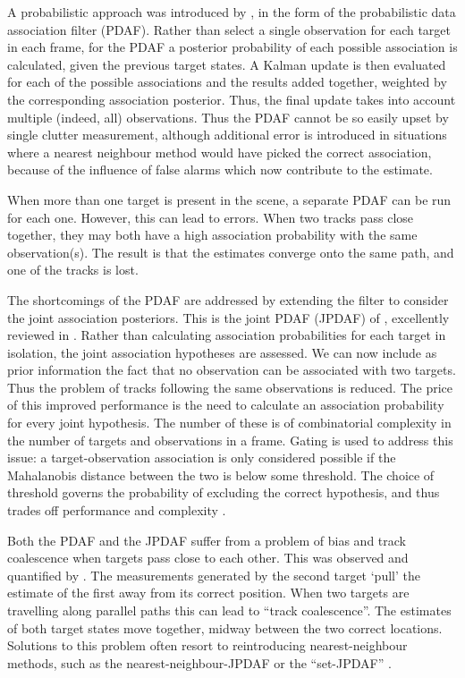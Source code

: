 A probabilistic approach was introduced by \cite{Bar-Shalom1975}, in the form of the probabilistic data association filter (PDAF). Rather than select a single observation for each target in each frame, for the PDAF a posterior probability of each possible association is calculated, given the previous target states. A Kalman update is then evaluated for each of the possible associations and the results added together, weighted by the corresponding association posterior. Thus, the final update takes into account multiple (indeed, all) observations. Thus the PDAF cannot be so easily upset by single clutter measurement, although additional error is introduced in situations where a nearest neighbour method would have picked the correct association, because of the influence of false alarms which now contribute to the estimate.

When more than one target is present in the scene, a separate PDAF can be run for each one. However, this can lead to errors. When two tracks pass close together, they may both have a high association probability with the same observation(s). The result is that the estimates converge onto the same path, and one of the tracks is lost.

The shortcomings of the PDAF are addressed by extending the filter to consider the joint association posteriors. This is the joint PDAF (JPDAF) of \cite{Fortmann1983}, excellently reviewed in \cite{Bar-Shalom2009}. Rather than calculating association probabilities for each target in isolation, the joint association hypotheses are assessed. We can now include as prior information the fact that no observation can be associated with two targets. Thus the problem of tracks following the same observations is reduced. The price of this improved performance is the need to calculate an association probability for every joint hypothesis. The number of these is of combinatorial complexity in the number of targets and observations in a frame. Gating is used to address this issue: a target-observation association is only considered possible if the Mahalanobis distance between the two is below some threshold. The choice of threshold governs the probability of excluding the correct hypothesis, and thus trades off performance and complexity \cite{Sea1971}.

Both the PDAF and the JPDAF suffer from a problem of bias and track coalescence when targets pass close to each other. This was observed and quantified by \cite{Fitzgerald1985}. The measurements generated by the second target `pull' the estimate of the first away from its correct position. When two targets are travelling along parallel paths this can lead to ``track coalescence''. The estimates of both target states move together, midway between the two correct locations. Solutions to this problem often resort to reintroducing nearest-neighbour methods, such as the nearest-neighbour-JPDAF \cite{Fitzgerald1986} or the ``set-JPDAF'' \cite{Svensson2009a}.

